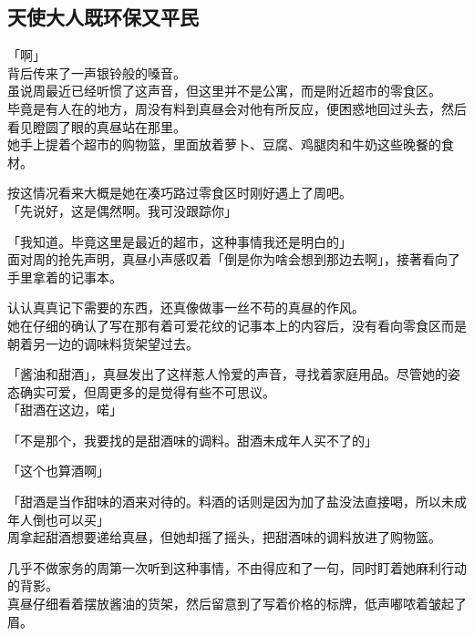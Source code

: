 \subsection{天使大人既环保又平民}

「啊」\\

背后传来了一声银铃般的嗓音。\\

虽说周最近已经听惯了这声音，但这里并不是公寓，而是附近超市的零食区。\\

毕竟是有人在的地方，周没有料到真昼会对他有所反应，便困惑地回过头去，然后看见瞪圆了眼的真昼站在那里。\\

她手上提着个超市的购物篮，里面放着萝卜、豆腐、鸡腿肉和牛奶这些晚餐的食材。

按这情况看来大概是她在凑巧路过零食区时刚好遇上了周吧。\\

「先说好，这是偶然啊。我可没跟踪你」

「我知道。毕竟这里是最近的超市，这种事情我还是明白的」\\

面对周的抢先声明，真昼小声感叹着「倒是你为啥会想到那边去啊」，接著看向了手里拿着的记事本。

认认真真记下需要的东西，还真像做事一丝不苟的真昼的作风。\\

她在仔细的确认了写在那有着可爱花纹的记事本上的内容后，没有看向零食区而是朝着另一边的调味料货架望过去。

「酱油和甜酒」，真昼发出了这样惹人怜爱的声音，寻找着家庭用品。尽管她的姿态确实可爱，但周更多的是觉得有些不可思议。\\

「甜酒在这边，喏」

「不是那个，我要找的是甜酒味的调料。甜酒未成年人买不了的」

「这个也算酒啊」

「甜酒是当作甜味的酒来对待的。料酒的话则是因为加了盐没法直接喝，所以未成年人倒也可以买」\\

周拿起甜酒想要递给真昼，但她却摇了摇头，把甜酒味的调料放进了购物篮。

几乎不做家务的周第一次听到这种事情，不由得应和了一句，同时盯着她麻利行动的背影。\\

真昼仔细看着摆放酱油的货架，然后留意到了写着价格的标牌，低声嘟哝着皱起了眉。\\

